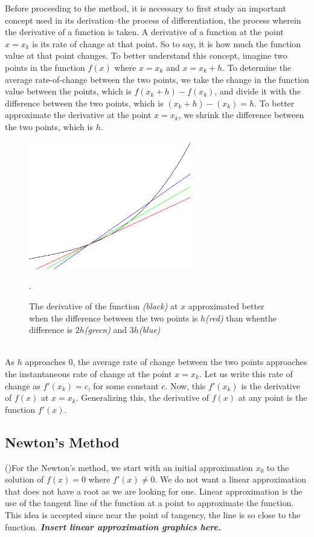 Before proceeding to the method, it is necessary to first study an important concept used in its derivation--the process of differentiation, the process wherein the derivative of a function is taken.
A derivative of a function at the point $x=x_k$ is its rate of change at that point. So to say, it is how much the function value at that point changes. To better understand this concept, imagine two points in the function $f(x)$ where $x=x_k$ and $x=x_k+h$. To determine the average rate-of-change between the two points, we take the change in the function value between the points, which is $f(x_k+h)-f(x_k)$, and divide it with the difference between the two points, which is $(x_k+h)-(x_k)=h$. To better approximate the derivative at the point $x=x_k$, we shrink the difference between the two points, which is $h$.
\begin{figure}[h]
	\captionsetup{width=.7\linewidth}
	\center
	\includegraphics[width = 200pt]{aveROC}
	\caption{The derivative of the function \textit{(black)} at $x$ approximated better when the difference between the two points is $h$\textit{(red)} than whenthe difference is $2h$\textit{(green)} and $3h$\textit{(blue)}}.
	\label{figureNM}
\end{figure}
\\

As $h$ approaches $0$, the average rate of change between the two points approaches the instantaneous rate of change at the point $x=x_k$. Let us write this rate of change as $f'(x_k) = c$, for some constant $c$. Now, this $f'(x_k)$ is the derivative of $f(x)$ at $x=x_k$. Generalizing this, the derivative of $f(x)$ at any point is the function $f'(x)$.
\\

\subsection{Newton's Method}
(\cite{PaulNM})For the Newton's method, we start with an initial approximation $x_0$ to the solution of $f(x) = 0$ where $f'(x) \neq 0$. We do not want a linear approximation that does not have a root as we are looking for one. Linear approximation is the use of the tangent line of the function at a point to approximate the function. This idea is accepted since near the point of tangency, the line is so close to the function. \textit{\textbf{Insert linear approximation graphics here.}}

